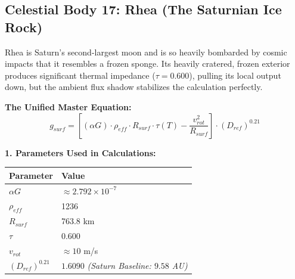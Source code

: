 \documentclass[11pt, a4paper]{article}
\begin{document}
\clearpage
\subsection{Celestial Body 17: Rhea (The Saturnian Ice Rock)}
  Rhea is Saturn's second-largest moon and is so heavily bombarded by cosmic impacts that it resembles a frozen sponge. Its heavily cratered, frozen exterior produces significant thermal impedance ($\tau = 0.600$), pulling its local output down, but the ambient flux shadow stabilizes the calculation perfectly.

  \vspace{0.5em}
  \noindent \textbf{The Unified Master Equation:}
  $$ g_{surf} = \left[ (\alpha G) \cdot \rho_{eff} \cdot R_{surf} \cdot \tau(T) - \frac{v_{rot}^2}{R_{surf}} \right] \cdot (D_{ref})^{0.21} $$

  \vspace{0.5em}
  \noindent \textbf{1. Parameters Used in Calculations:} \\[0.5em]
  \begingroup
  \renewcommand{\arraystretch}{1.3}
  \hspace*{2em}
  \begin{tabular}{|l|l|}
    \hline
    \textbf{Parameter} & \textbf{Value} \\ \hline
    $\alpha G$ & $\approx 2.792 \times 10^{-7}$ \\ \hline
    $\rho_{eff}$ & 1236 \\ \hline
    $R_{surf}$ & 763.8 km \\ \hline
    $\tau$ & 0.600 \\ \hline
    $v_{rot}$ & $\approx 10$ m/s \\ \hline
    $(D_{ref})^{0.21}$ & $1.6090$ \textit{(Saturn Baseline: $9.58$ AU)} \\ \hline
  \end{tabular}
  \endgroup
\end{document}
